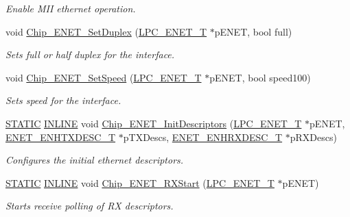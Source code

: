 \begin{DoxyCompactItemize}
\begin{DoxyCompactList}\small\item\em Enable M\+II ethernet operation. \end{DoxyCompactList}\item 
void \hyperlink{group___e_n_e_t__18_x_x__43_x_x_ga2e8f77b5b0c703d2dd0cb039dcc2a10c}{Chip\+\_\+\+E\+N\+E\+T\+\_\+\+Set\+Duplex} (\hyperlink{struct_l_p_c___e_n_e_t___t}{L\+P\+C\+\_\+\+E\+N\+E\+T\+\_\+T} $\ast$p\+E\+N\+ET, bool full)
\begin{DoxyCompactList}\small\item\em Sets full or half duplex for the interface. \end{DoxyCompactList}\item 
void \hyperlink{group___e_n_e_t__18_x_x__43_x_x_gafbae19c1935ad1a8f5ac17ddc7e186e1}{Chip\+\_\+\+E\+N\+E\+T\+\_\+\+Set\+Speed} (\hyperlink{struct_l_p_c___e_n_e_t___t}{L\+P\+C\+\_\+\+E\+N\+E\+T\+\_\+T} $\ast$p\+E\+N\+ET, bool speed100)
\begin{DoxyCompactList}\small\item\em Sets speed for the interface. \end{DoxyCompactList}\item 
\hyperlink{group___l_p_c___types___public___macros_ga10b2d890d871e1489bb02b7e70d9bdfb}{S\+T\+A\+T\+IC} \hyperlink{spifi__18xx__43xx_8h_a2eb6f9e0395b47b8d5e3eeae4fe0c116}{I\+N\+L\+I\+NE} void \hyperlink{group___e_n_e_t__18_x_x__43_x_x_ga11da2fb0538560adec98ab13199aa267}{Chip\+\_\+\+E\+N\+E\+T\+\_\+\+Init\+Descriptors} (\hyperlink{struct_l_p_c___e_n_e_t___t}{L\+P\+C\+\_\+\+E\+N\+E\+T\+\_\+T} $\ast$p\+E\+N\+ET, \hyperlink{struct_e_n_e_t___e_n_h_t_x_d_e_s_c___t}{E\+N\+E\+T\+\_\+\+E\+N\+H\+T\+X\+D\+E\+S\+C\+\_\+T} $\ast$p\+T\+X\+Descs, \hyperlink{struct_e_n_e_t___e_n_h_r_x_d_e_s_c___t}{E\+N\+E\+T\+\_\+\+E\+N\+H\+R\+X\+D\+E\+S\+C\+\_\+T} $\ast$p\+R\+X\+Descs)
\begin{DoxyCompactList}\small\item\em Configures the initial ethernet descriptors. \end{DoxyCompactList}\item 
\hyperlink{group___l_p_c___types___public___macros_ga10b2d890d871e1489bb02b7e70d9bdfb}{S\+T\+A\+T\+IC} \hyperlink{spifi__18xx__43xx_8h_a2eb6f9e0395b47b8d5e3eeae4fe0c116}{I\+N\+L\+I\+NE} void \hyperlink{group___e_n_e_t__18_x_x__43_x_x_ga1c12c6420ce2ddf9db02cae9a6a85cd5}{Chip\+\_\+\+E\+N\+E\+T\+\_\+\+R\+X\+Start} (\hyperlink{struct_l_p_c___e_n_e_t___t}{L\+P\+C\+\_\+\+E\+N\+E\+T\+\_\+T} $\ast$p\+E\+N\+ET)
\begin{DoxyCompactList}\small\item\em Starts receive polling of RX descriptors. \end{DoxyCompactList}\item 

\end{DoxyCompactItemize}
